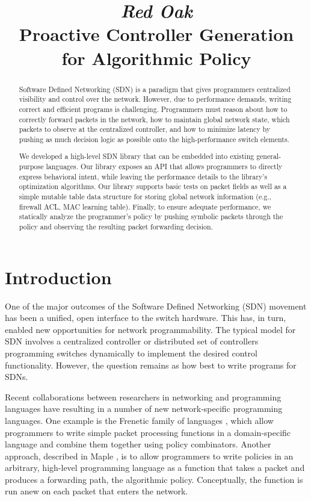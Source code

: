 \documentclass[preprint]{sigplanconf}
\title{\textit{Red Oak}\\ Proactive Controller Generation for Algorithmic Policy}
\begin{document}
\maketitle


\begin{abstract}
Software Defined Networking (SDN) is a paradigm that gives programmers 
centralized visibility and control over the network. However, due to performance 
demands, writing correct and efficient programs is challenging. Programmers must 
reason about how to correctly forward packets in the network, how to maintain
global network state, which packets to observe at the centralized controller, 
and how to minimize latency by pushing as much decision logic
as possible onto the high-performance switch elements.

We developed a high-level SDN library that can be embedded into existing general-purpose languages.
Our library exposes an API that allows programmers to directly express behavioral intent, 
while leaving the performance details to the library's optimization algorithms.
Our library supports basic tests on packet fields as well as a simple mutable table
data structure for storing global network information (e.g., firewall ACL, MAC learning table).
Finally, to ensure adequate performance, 
we statically analyze the programmer's policy by pushing symbolic packets through the policy 
and observing the resulting packet forwarding decision.
\end{abstract}


\section*{Introduction}

One of the major outcomes of the Software Defined Networking (SDN) movement has been a unified, open interface to the switch hardware. This has, in turn, enabled new opportunities for network programmability. The typical model for SDN involves a centralized controller or distributed set of controllers programming switches dynamically to implement the desired control functionality.
However, the question remains as how best to write programs for SDNs.

Recent collaborations between researchers in networking and programming languages have resulting in a number of new network-specific programming languages. One example is the Frenetic family of languages \cite{Frenetic}, which allow programmers to write simple packet processing functions in a domain-specific language and combine them together using policy combinators. Another approach, described in Maple \cite{Maple}, is to allow programmers to write policies in an arbitrary, high-level programming language as a function that takes a packet and produces a forwarding path, the algorithmic policy. Conceptually, the function is run anew on each packet that enters the network.
\end{document}
